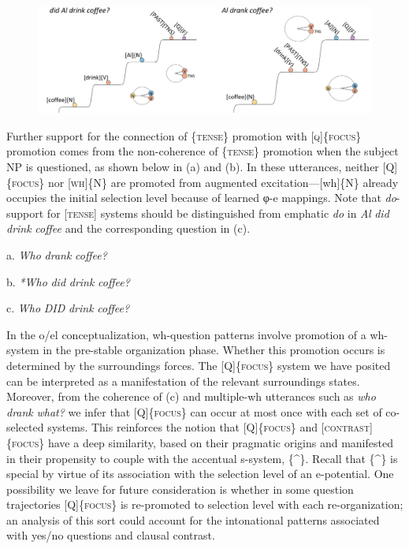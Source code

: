   
\begin{figure}
\includegraphics[width=\textwidth]{figures/Tilsen-img160.png}
\caption{\missingcaption}
\label{fig:}
\end{figure}
 

  Further support for the connection of \{\textsc{tense}\} promotion with [\textsc{q}]\{\textsc{focus}\} promotion comes from the non-coherence of \{\textsc{tense}\} promotion when the subject NP is questioned, as shown below in (a) and (b). In these utterances, neither [Q]\{\textsc{focus}\} nor [\textsc{wh}]\{N\} are promoted from augmented excitation—[wh]\{N\} already occupies the initial selection level because of learned φ-e mappings. Note that \textit{do}{}-support for [\textsc{tense}] systems should be distinguished from emphatic \textit{do} in \textit{Al} \textit{did} \textit{drink} \textit{coffee} and the corresponding question in (c).  

  a.  \textit{Who} \textit{drank} \textit{coffee?} 

  b.  \textit{*Who} \textit{did} \textit{drink} \textit{coffee?}

  c.  \textit{Who} \textit{DID} \textit{drink} \textit{coffee?}

  In the o/el conceptualization, wh-question patterns involve promotion of a wh-system in the pre-stable organization phase. Whether this promotion occurs is determined by the surroundings forces. The [\textsc{Q}]\{\textsc{focus}\} system we have posited can be interpreted as a manifestation of the relevant surroundings states. Moreover, from the coherence of (c) and multiple-wh utterances such as \textit{who} \textit{drank} \textit{what?} we infer that [Q]\{\textsc{focus}\} can occur at most once with each set of co-selected systems. This reinforces the notion that [Q]\{\textsc{focus}\} and [\textsc{contrast}]\{\textsc{focus}\} have a deep similarity, based on their pragmatic origins and manifested in their propensity to couple with the accentual s-system, \{\^{}\}. Recall that \{\^{}\} is special by virtue of its association with the selection level of an e-potential. One possibility we leave for future consideration is whether in some question trajectories [Q]\{\textsc{focus}\} is re-promoted to selection level with each re-organization; an analysis of this sort could account for the intonational patterns associated with yes/no questions and clausal contrast.

